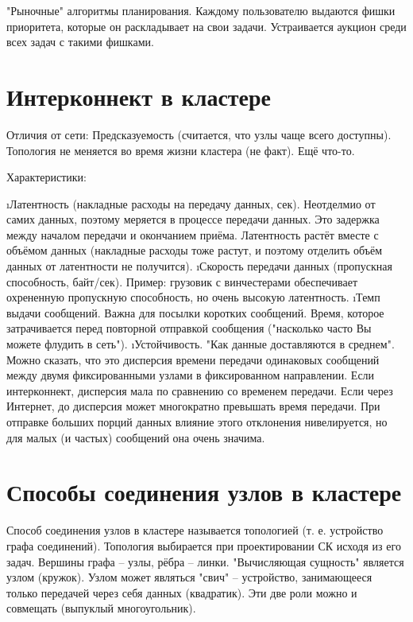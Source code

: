 \begin{enumerate}
	"Рыночные" алгоритмы планирования.
	Каждому пользователю выдаются фишки приоритета, которые он раскладывает на свои задачи. Устраивается аукцион среди всех задач с такими фишками. 
	
	\section{Интерконнект в кластере}
	Отличия от сети:
	Предсказуемость (считается, что узлы чаще всего доступны). Топология не меняется во время жизни кластера (не факт).
	Ещё что-то.
	
	Характеристики:
	\begin{enumerate}
		\i Латентность (накладные расходы на передачу данных, сек). Неотделмио от самих данных, поэтому меряется в процессе передачи данных. Это задержка между началом передачи и окончанием приёма. Латентность растёт вместе с объёмом данных (накладные расходы тоже растут, и поэтому отделить объём данных от латентности не получится). 
		\i Скорость передачи данных (пропускная способность, байт/сек).
			Пример: грузовик с винчестерами обеспечивает охрененную пропускную способность, но очень высокую латентность.
		\i Темп выдачи сообщений. Важна для посылки коротких сообщений. Время, которое затрачивается перед повторной отправкой сообщения ("насколько часто Вы можете флудить в сеть").
		\i Устойчивость. "Как данные доставляются в среднем". Можно сказать, что это дисперсия времени передачи одинаковых сообщений между двумя фиксированными узлами в фиксированном направлении. Если интерконнект, дисперсия мала по сравнению со временем передачи. Если через Интернет, до дисперсия может многократно превышать время передачи. 
		При отправке больших порций данных влияние этого отклонения нивелируется, но для малых (и частых) сообщений она очень значима.
	\end{enumerate}
\end{enumerate}

 \section{Способы соединения узлов в кластере}
 Способ соединения узлов в кластере называется топологией (т. е. устройство графа соединений). Топология выбирается при проектировании СК исходя из его задач.
 Вершины графа -- узлы, рёбра -- линки. "Вычисляющая сущность" является узлом (кружок). Узлом может являться "свич" -- устройство, занимающееся только передачей через себя данных (квадратик). Эти две роли можно и совмещать (выпуклый многоугольник).
 
